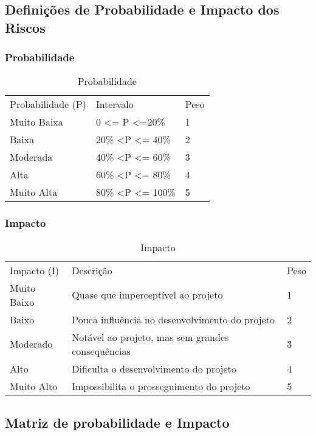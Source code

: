 \subsection{Definições de Probabilidade e Impacto dos Riscos}
\subsubsection{Probabilidade}

\begin{table}[htp]
\centering
\caption{Probabilidade}
\label{probabilidade}
\begin{tabular}{lll}
Probabilidade (P) & Intervalo                         & Peso \\
Muito Baixa       & 0 \textless= P \textless=20\%     & 1    \\
Baixa             & 20\% \textless P \textless= 40\%  & 2    \\
Moderada          & 40\% \textless P \textless= 60\%  & 3    \\
Alta              & 60\% \textless P \textless= 80\%  & 4    \\
Muito Alta        & 80\% \textless P \textless= 100\% & 5   
\end{tabular}
\end{table}

\subsubsection{Impacto}

\begin{table}[htp]
\centering
\caption{Impacto}
\label{impacto}
\begin{tabular}{lll}
Impacto (I) & Descrição                                         & Peso \\
Muito Baixo & Quase que imperceptível ao projeto                & 1    \\
Baixo       & Pouca influência no desenvolvimento do projeto    & 2    \\
Moderado    & Notável ao projeto, mas sem grandes consequências & 3    \\
Alto        & Dificulta o desenvolvimento do projeto            & 4    \\
Muito Alto  & Impossibilita o prosseguimento do projeto         & 5   
\end{tabular}
\end{table}

\subsection{Matriz de probabilidade e Impacto}

